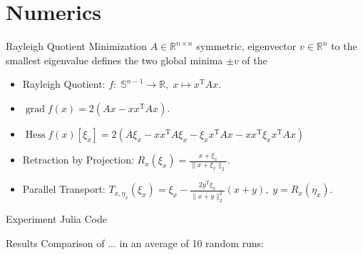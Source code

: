 \documentclass{beamer}
\begin{document}
\section{Numerics}

\begin{frame}{Rayleigh Quotient Minimization}
    $A \in \mathbb{R}^{n \times n}$ symmetric, eigenvector $v \in \mathbb{R}^n$ to the smallest eigenvalue defines the two global minima $\pm v$ of the
    \begin{itemize}
        \item Rayleigh Quotient: $f \colon \; \mathbb{S}^{n-1} \to \mathbb{R}, \; x \mapsto x^{\mathrm{T}} A x$.
        \item $\operatorname{grad} f(x) = 2(Ax - x x^{\mathrm{T}} A x)$.
        \item $\operatorname{Hess} f(x) [\xi_x] = 2 (A \xi_x - x x^{\mathrm{T}} A \xi_x - \xi_x x^{\mathrm{T}} A x - x x^{\mathrm{T}} \xi_x x^{\mathrm{T}} A x)$
        \item Retraction by Projection: $R_x (\xi_x) = \frac{x + \xi_x}{\lVert x + \xi_x \rVert_2}$.
        \item Parallel Transport: $T_{x, \eta_x}(\xi_x) = \xi_x - \frac{2 y^{\mathrm{T}} \xi_x}{\lVert x + y \rVert^{2}_2} (x + y), \; y = R_x(\eta_x)$.
    \end{itemize}
\end{frame}

\begin{frame}{Experiment}
    Julia Code
\end{frame}

\begin{frame}{Results}
    Comparison of ... in an average of 10 random runs:
    \begin{table}[H]
    \end{table}
\end{frame}
\end{document}
